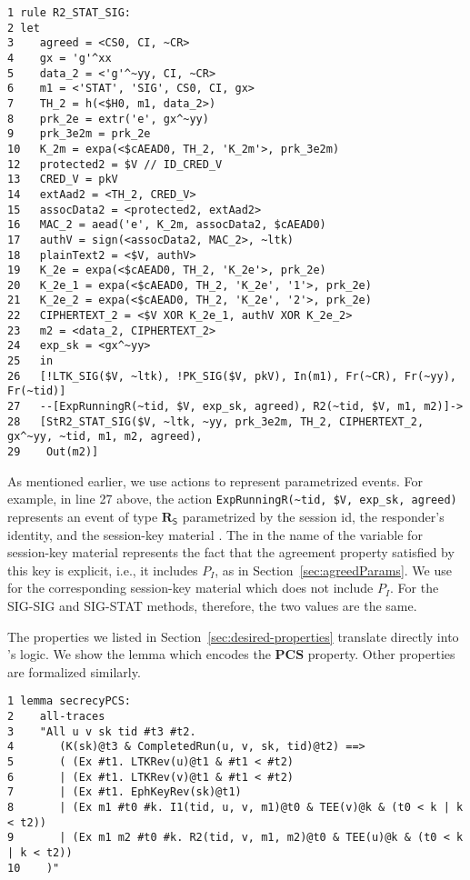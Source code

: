 \documentclass[runningheads]{llncs}
\newcommand{\mFunStyle}[1]{\textsf{#1}}
\newcommand{\mConstStyle}[1]{\textsf{#1}}
\newcommand{\mMethodStyle}[1]{\mConstStyle{#1}}
\newcommand{\mProtocolStyle}[1]{\text{#1}}
\newcommand{\mRStart}{\ensuremath{\mathbf{R}_\mFunStyle{S}}}
\newcommand{\mPredPcs}{\ensuremath{\mathbf{PCS}}}
\newcommand{\mTamarin}{\mProtocolStyle{Tamarin}}
\newcommand{\mSigStat}{\mMethodStyle{SIG-STAT}}
\newcommand{\mSigSig}{\mMethodStyle{SIG-SIG}}
\newcommand{\mT}[1]{\text{\texttt{#1}}}
\begin{document}
{\parindent 0pt
\begin{minipage}{\textwidth}
\begin{scriptsize}
\begin{verbatim}
1 rule R2_STAT_SIG:
2 let
3    agreed = <CS0, CI, ~CR>
4    gx = 'g'^xx
5    data_2 = <'g'^~yy, CI, ~CR>
6    m1 = <'STAT', 'SIG', CS0, CI, gx>
7    TH_2 = h(<$H0, m1, data_2>)
8    prk_2e = extr('e', gx^~yy)
9    prk_3e2m = prk_2e
10   K_2m = expa(<$cAEAD0, TH_2, 'K_2m'>, prk_3e2m)
12   protected2 = $V // ID_CRED_V
13   CRED_V = pkV
14   extAad2 = <TH_2, CRED_V>
15   assocData2 = <protected2, extAad2>
16   MAC_2 = aead('e', K_2m, assocData2, $cAEAD0)
17   authV = sign(<assocData2, MAC_2>, ~ltk)
18   plainText2 = <$V, authV>
19   K_2e = expa(<$cAEAD0, TH_2, 'K_2e'>, prk_2e)
20   K_2e_1 = expa(<$cAEAD0, TH_2, 'K_2e', '1'>, prk_2e)
21   K_2e_2 = expa(<$cAEAD0, TH_2, 'K_2e', '2'>, prk_2e)
22   CIPHERTEXT_2 = <$V XOR K_2e_1, authV XOR K_2e_2>
23   m2 = <data_2, CIPHERTEXT_2>
24   exp_sk = <gx^~yy>
25   in
26   [!LTK_SIG($V, ~ltk), !PK_SIG($V, pkV), In(m1), Fr(~CR), Fr(~yy), Fr(~tid)]
27   --[ExpRunningR(~tid, $V, exp_sk, agreed), R2(~tid, $V, m1, m2)]->
28   [StR2_STAT_SIG($V, ~ltk, ~yy, prk_3e2m, TH_2, CIPHERTEXT_2, gx^~yy, ~tid, m1, m2, agreed),
29    Out(m2)]
\end{verbatim}
\end{scriptsize}
\end{minipage}}
\vspace{5mm}

As mentioned earlier, we use actions to represent parametrized events.
%
For example, in line 27 above, the action
\verb|ExpRunningR(~tid, $V, exp_sk, agreed)| represents an event of type
\mRStart{} parametrized by the session id, the responder's identity, and the
session-key material \mT{exp\_sk}.
%
The \mT{exp} in the name of the variable for session-key material represents
the fact that the agreement property satisfied by this key is explicit, i.e.,
it includes $P_{I}$, as in Section~\ref{sec:agreedParams}.
%
We use \mT{imp\_sk} for the corresponding session-key material which does 
not
include $P_{I}$.
%
For the \mSigSig{} and \mSigStat{} methods, therefore, the two values are the
same.
%

The properties we listed in Section~\ref{sec:desired-properties}
translate directly into \mTamarin's logic.
%
We show the \mTamarin{} lemma which encodes the \mPredPcs{} property.
%
Other properties are formalized similarly. 
%

\begin{scriptsize}
\begin{verbatim}
1 lemma secrecyPCS:
2    all-traces
3    "All u v sk tid #t3 #t2.
4       (K(sk)@t3 & CompletedRun(u, v, sk, tid)@t2) ==>
5       ( (Ex #t1. LTKRev(u)@t1 & #t1 < #t2)
6       | (Ex #t1. LTKRev(v)@t1 & #t1 < #t2)
7       | (Ex #t1. EphKeyRev(sk)@t1)
8       | (Ex m1 #t0 #k. I1(tid, u, v, m1)@t0 & TEE(v)@k & (t0 < k | k < t2))
9       | (Ex m1 m2 #t0 #k. R2(tid, v, m1, m2)@t0 & TEE(u)@k & (t0 < k | k < t2))
10    )"
\end{verbatim}
\end{scriptsize}
%
\end{document}
